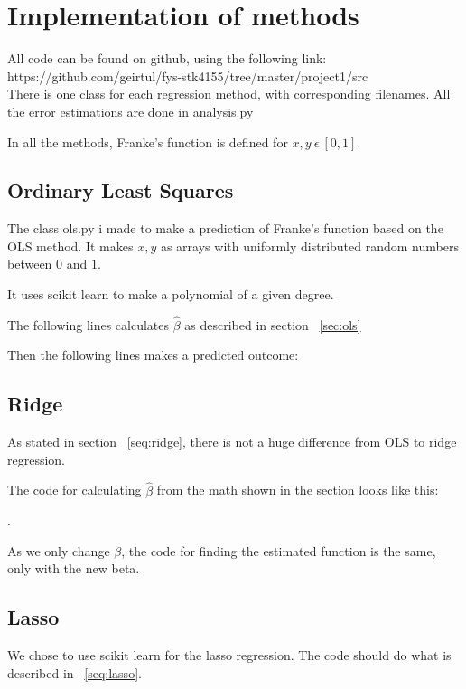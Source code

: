\section{Implementation of methods}
All code can be found on github, using the following link:\\ 
https://github.com/geirtul/fys-stk4155/tree/master/project1/src\\

There is one class for each regression method, with corresponding 
filenames.
All the error estimations are done in analysis.py

In all the methods, Franke's function is defined for 
\(x,y \ \epsilon \ [0,1]\). 

\subsection{Ordinary Least Squares}
The class ols.py i made to make a prediction of Franke's function
based on the OLS method. 
It makes \(x, y\) as arrays with uniformly distributed random numbers 
between \(0\) and \(1\). 

It uses scikit learn to make a polynomial of a given degree. 

The following lines calculates \(\hat{\beta}\) as described in 
section ~\ref{sec:ols} 



Then the following lines makes a predicted outcome:



\subsection{Ridge}
As stated in section ~\ref{seq:ridge}, there is 
not a huge difference from OLS to ridge regression. 

The code for calculating \(\hat{\beta}\) from the math  
shown in the section
looks like this: 

.

As we only change \(\beta\), the code for finding the estimated function 
is the same, only with the new beta. 

\subsection{Lasso}
We chose to use scikit learn for the lasso regression. The code should 
do what is described in ~\ref{seq:lasso}. 

